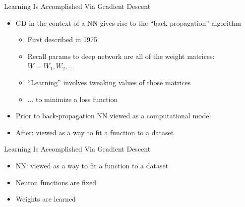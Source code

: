 \documentclass[aspectratio=169]{beamer}
\begin{document}
\begin{frame}{Learning Is Accomplished Via Gradient Descent}

\begin{itemize}
	\item GD in the context of a NN gives rise to the ``back-propagation'' algorithm
	\begin{itemize}
	\item First described in 1975
	\item Recall params to deep network are all of the weight matrices: $W = W_1, W_2, ...$
	\item ``Learning'' involves tweaking values of those matrices
	\item $\ldots$ to minimize a loss function
	\end{itemize}
\item Prior to back-propagation NN viewed as a computational model
\item After: viewed as a way to fit a function to a dataset
\end{itemize}
\end{frame}
\begin{frame}{Learning Is Accomplished Via Gradient Descent}

\begin{itemize}
\item NN: viewed as a way to fit a function to a dataset
\item Neuron functions are fixed
\item Weights are learned
\end{itemize}
\end{frame}
\end{document}
